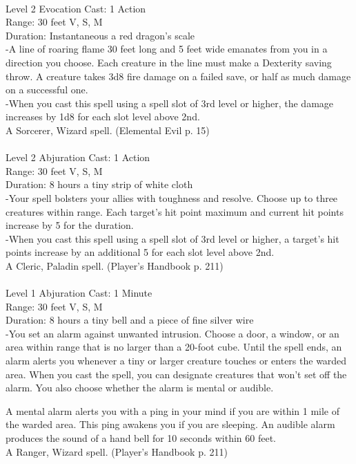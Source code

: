 \documentclass[10pt,twocolumn]{report}
\begin{document}
 \\
Level 2 \quad Evocation \quad Cast: 1 Action\\
Range: 30 feet \quad V, S, M\\
Duration: Instantaneous \quad a red dragon’s scale\\
-A line of roaring flame 30 feet long and 5 feet wide emanates from you in a direction you choose. 
Each creature in the line must make a Dexterity saving throw. A creature takes 3d8 fire damage on a failed save, or half as much damage on a successful one.\\
-When you cast this spell using a spell slot of 3rd level or higher, the damage increases by 1d8 for each slot level above 2nd.\\
A Sorcerer, Wizard spell. (Elemental Evil p. 15) \\


 \\
Level 2 \quad Abjuration \quad Cast: 1 Action\\
Range: 30 feet \quad V, S, M\\
Duration: 8 hours \quad a tiny strip of white cloth\\
-Your spell bolsters your allies with toughness and resolve. 
Choose up to three creatures within range. Each target’s hit point maximum and current hit points increase by 5 for the duration.\\
-When you cast this spell using a spell slot of 3rd level or higher, a target’s hit points increase by an additional 5 for each slot level above 2nd.\\
A Cleric, Paladin spell. (Player's Handbook p. 211) \\


 \\
Level 1 \quad Abjuration \quad Cast: 1 Minute\\
Range: 30 feet \quad V, S, M\\
Duration: 8 hours \quad a tiny bell and a piece of fine silver wire\\
-You set an alarm against unwanted intrusion. 
Choose a door, a window, or an area within range that is no larger than a 20-foot cube. Until the spell ends, an alarm alerts you whenever a tiny or larger creature touches or enters the warded area. When you cast the spell, you can designate creatures that won’t set off the alarm. You also choose whether the alarm is mental or audible. 

A mental alarm alerts you with a ping in your mind if you are within 1 mile of the warded area. This ping awakens you if you are sleeping. 
An audible alarm produces the sound of a hand bell for 10 seconds within 60 feet.\\
A Ranger, Wizard spell. (Player's Handbook p. 211) \\
\end{document}
